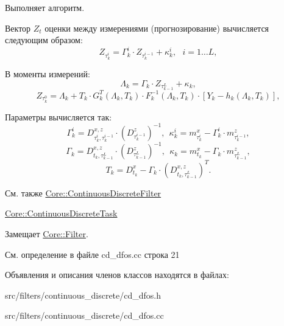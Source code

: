 Выполняет алгоритм. 

Вектор $Z_t$ оценки между измерениями (прогнозирование) вычисляется следующим образом\+: \[Z_{\tau_k^i} = \Gamma_k^i \cdot Z_{\tau_k^{i-1}} + \kappa_k^i,\ \ \ i = 1 \ldots L,\]

В моменты измерений\+: \[\Lambda_k = \Gamma_k \cdot Z_{\tau_{k-1}^L} + \kappa_k,\] \[Z_{\tau_k^0} = \Lambda_k + T_k \cdot G_k^T(\Lambda_k, T_k) \cdot F_k^{-1}(\Lambda_k, T_k) \cdot [Y_k - h_k(\Lambda_k, T_k)],\]

Параметры вычисляется так\+: \[\Gamma_k^i = D_{\tau_k^i,\tau_k^{i-1}}^{x,z} \cdot (D_{\tau_k^{i-1}}^z)^{-1},\ \ \kappa_k^i = m_{\tau_k^i}^x - \Gamma_k^i \cdot m_{\tau_k^{i-1}}^z,\] \[\Gamma_k = D_{t_k,\tau_{k-1}^L}^{x,z} \cdot (D_{\tau_{k-1}^L}^z)^{-1},\ \ \kappa_k = m_{t_k}^x - \Gamma_k \cdot m_{\tau_{k-1}^L}^z,\] \[T_k = D_{t_k}^x - \Gamma_k \cdot (D_{t_k,\tau_{k-1}^L}^{x,z})^T.\]

\begin{DoxySeeAlso}{См. также}
\hyperlink{class_core_1_1_continuous_discrete_filter}{Core\+::\+Continuous\+Discrete\+Filter} 

\hyperlink{class_core_1_1_continuous_discrete_task}{Core\+::\+Continuous\+Discrete\+Task} 
\end{DoxySeeAlso}


Замещает \hyperlink{class_core_1_1_filter_a438681ee3e54aba2148042d9f8011ab8}{Core\+::\+Filter}.



См. определение в файле cd\+\_\+dfos.\+cc строка 21



Объявления и описания членов классов находятся в файлах\+:\begin{DoxyCompactItemize}
\item 
src/filters/continuous\+\_\+discrete/cd\+\_\+dfos.\+h\item 
src/filters/continuous\+\_\+discrete/cd\+\_\+dfos.\+cc\end{DoxyCompactItemize}
